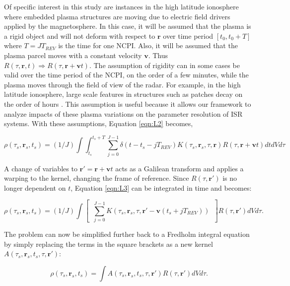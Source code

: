 Of specific interest in this study are instances in the high latitude ionosphere where embedded plasma structures are moving due to electric field drivers applied by the magnetosphere. In this case, it will be assumed that the plasma is a rigid object and will not deform with respect to $\mathbf{r}$ over time period $[t_0,t_0+T]$ where $T=JT_{REV}$ is the time for one NCPI. Also, it will be assumed that the plasma parcel moves with a constant velocity $\mathbf{v}$. Thus $R(\tau,\mathbf{r},t)\Rightarrow R(\tau,\mathbf{r}+\mathbf{v}t)$. The assumption of rigidity can in some cases be valid over the time period of the NCPI, on the order of a few minutes, while the plasma moves through the field of view of the radar. For example, in the high latitude ionosphere, large scale features in structures such as patches decay on the order of hours \cite{Tsunoda:1988ul}. This assumption is useful because it allows our framework to analyze impacts of these plasma variations on the parameter resolution of ISR systems. With these assumptions, Equation \ref{eqn:L2} becomes,

\begin{equation}
\label{eqn:L3}
\rho(\tau_s,\mathbf{r}_s,t_s) =(1/J) \int \int_{t_s}^{t_s+T} \displaystyle \sum_{j=0}^{J-1}\delta(t-t_s-jT_{REV}) K(\tau_s,\mathbf{r}_s,\tau,\mathbf{r})R(\tau,\mathbf{r}+\mathbf{v}t)dtdVd\tau\end{equation}

A change of variables to $\mathbf{r}' = \mathbf{r}+\mathbf{v}t$ acts as a Galilean transform and applies a warping to the kernel, changing the frame of reference. Since $R(\tau,\mathbf{r}')$ is no longer dependent on $t$, Equation \ref{eqn:L3} can be integrated in time and becomes:

\begin{equation}
\label{eqn:L5}
\rho(\tau_s,\mathbf{r}_s,t_s)= (1/J)\int \left[ \;\;  \displaystyle \sum_{j=0}^{J-1} K(\tau_s,\mathbf{r}_s,\tau,\mathbf{r}'-\mathbf{v}(t_s+jT_{REV})) \;\; \right]R(\tau,\mathbf{r}')dVd\tau.
\end{equation}

The problem can now be simplified further back to a Fredholm integral equation by simply replacing the terms in the square brackets as a new kernel $A(\tau_s,\mathbf{r}_s,t_s,\tau,\mathbf{r}')$:

\begin{equation}
\label{eqn:L6}
\rho(\tau_s,\mathbf{r}_s,t_s)= \int A(\tau_s,\mathbf{r}_s,t_s,\tau,\mathbf{r}') R(\tau,\mathbf{r}')dVd\tau.
\end{equation}

